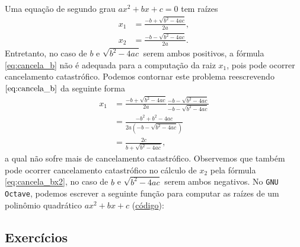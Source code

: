 \begin{ex}\label{ex:solpq}
  Uma equação de segundo grau $ax^2 + bx + c = 0$ tem raízes
  \begin{align}
    x_1 &= \frac{-b + \sqrt{b^2 - 4ac}}{2a},\label{eq:cancela_b}\\
    x_2 &= \frac{-b - \sqrt{b^2 - 4ac}}{2a}.\label{eq:cancela_bx2}
  \end{align}
Entretanto, no caso de $b$ e $\sqrt{b^2 - 4ac}$ serem ambos positivos, a fórmula \eqref{eq:cancela_b} não é adequada para a computação da raiz $x_1$, pois pode ocorrer cancelamento catastrófico. Podemos contornar este problema reescrevendo $\eqref{eq:cancela_b}$ da seguinte forma
\begin{align}
  x_1 &= \frac{-b + \sqrt{b^2 - 4ac}}{2a}\frac{-b - \sqrt{b^2 - 4ac}}{-b - \sqrt{b^2 - 4ac}}\\
  &= \frac{-b^2 + b^2 - 4ac}{2a(-b-\sqrt{b^2-4ac})}\\
  &= \frac{2c}{b+\sqrt{b^2-4ac}},
\end{align}
a qual não sofre mais de cancelamento catastrófico. Observemos que também pode ocorrer cancelamento catastrófico no cálculo de $x_2$ pela fórmula \eqref{eq:cancela_bx2}, no caso de $b$ e $\sqrt{b^2 - 4ac}$ serem ambos negativos.
\ifisoctave
No \verb+GNU Octave+, podemos escrever a seguinte função para computar as raízes de um polinômio quadrático $ax^2 + bx + c$ (\href{https://github.com/phkonzen/notas/blob/master/src/MatematicaNumerica/cap_aritm/dados/ex_solpq/ex_solpq.m}{código}):

\fi
\end{ex}

\subsection*{Exercícios}

\emconstrucao
